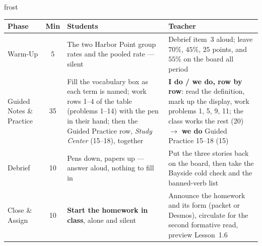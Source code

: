 \documentclass[10pt]{article}
\begin{document}
\begin{fixedskillbox}{frost}
\renewcommand{\arraystretch}{1.25}
\begin{tabularx}{\linewidth}{@{}l c X X@{}}
\textbf{Phase} & \textbf{Min} & \textbf{Students} & \textbf{Teacher} \\
\hline
Warm-Up & 5 & The two Harbor Point group rates and the pooled rate --- silent & Debrief item~3
  aloud; leave $70\%$, $45\%$, $25$ points, and $55\%$ on the board all period \\
Guided Notes \& Practice & 35 & Fill the vocabulary box as each term is named; work rows 1--4
  of the table (problems 1--14) with the pen in their hand; then the Guided Practice row,
  \emph{Study Center} (15--18), together & \textbf{I do / we do, row by row}: read the
  definition, mark up the display, work problems 1, 5, 9, 11; the class works the rest (20)
  $\to$ \textbf{we do} Guided Practice 15--18 (15) \\
Debrief & 10 & Pens down, papers up --- answer aloud, nothing to fill in & Put the three
  stories back on the board, then take the Bayside cold check and the banned-verb list \\
Close \& Assign & 10 & \textbf{Start the homework in class}, alone and silent & Announce the
  homework and its form (packet or Desmos), circulate for the second formative read, preview
  Lesson~1.6 \\
\end{tabularx}
\end{fixedskillbox}
\end{document}
